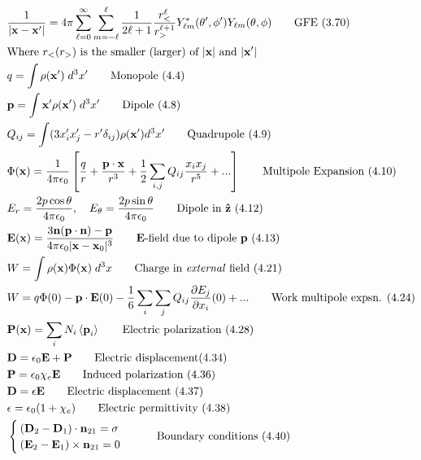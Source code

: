 \documentclass[10pt]{article}
\newcommand{\zhat}{\boldsymbol{\hat{\textbf{z}}}}
\newcommand{\vect}[1]{\boldsymbol{\mathbf{#1}}}
\newcommand{\vc}[1]{\mathbf{#1}}
\newcommand{\eo}{\epsilon_0}
\newcommand{\pder}[2]{\frac{\partial #1}{\partial #2}}
\newcommand{\ev}[1]{\left\langle #1 \right\rangle}
\newcommand{\K}{\frac{1}{4 \pi \eo}}
\begin{document}
\begin{multicols}{2}
\begin{align*}
		& \frac{1}{|\vc{x} - \vc{x}'|} = 4 \pi \sum_{\ell = 0}^\infty \sum_{m = -\ell}^{\ell} \frac{1}{2 \ell +1} \frac{r_<^\ell}{r_>^{\ell +1}} Y_{\ell m}^*(\theta', \phi') Y_{\ell m}(\theta,\phi)	\tag*{GFE (3.70)} \\
		&\text{Where $r_< (r_>)$ is the smaller (larger) of $|\vc{x}|$ and $|\vc{x}'|$} \\
		& q = \int \rho(\vect{x}') \; d^3x'	\tag*{Monopole (4.4)} \\
		& \vect{p} = \int \vect{x}' \rho(\vect{x}') \; d^3x'	\tag*{Dipole (4.8)} \\
		& Q_{ij} = \int (3 x_i' x_j'- r' \delta_{ij})\rho(\vect{x}') d^3x'		\tag*{Quadrupole (4.9)} \\
		&\Phi(\vect{x}) = \K \left[ \frac{q}{r} + \frac{ \vect{p} \cdot \vect{x}}{r^3} + \frac{1}{2} \sum_{i,j} Q_{ij} \frac{x_i x_j}{r^5} + ... \right] \tag*{Multipole Expansion (4.10)} \\
		& E_r=\frac{2 p \cos \theta}{4 \pi \eo}, \quad E_\theta=\frac{2 p \sin \theta}{4 \pi \eo} \tag*{Dipole in $\zhat$ (4.12)} \\
		& \vect{E}(\vect{x}) = \frac{3 \vect{n}(\vect{p} \cdot \vect{n}) - \vect{p}}{4 \pi \eo |\vect{x} - \vect{x}_0|^3} \tag*{$\vect{E}$-field due to dipole $\vect{p}$ (4.13)} \\
		& W = \int \rho(\vect{x}) \Phi(\vect{x})\; d^3x \tag*{Charge in \textit{external} field (4.21)} \\
		& W = q \Phi(0) - \vect{p} \cdot \vect{E}(0) - \frac{1}{6} \sum_i \sum_j Q_{ij} \pder{E_j}{x_i}(0) + ... \tag*{Work multipole expsn. (4.24)} \\
		& \vect{P}(\vect{x}) = \sum_i N_i \ev{\vect{p}_i} \tag*{Electric polarization (4.28)} \\
		& \vect{D} = \eo \vect{E} + \vect{P} \tag*{Electric displacement(4.34)} \\
		& \vect{P} = \eo \chi_e \vect{E} \tag*{Induced polarization (4.36)} \\
		& \vect{D} = \epsilon \vect{E} \tag*{Electric displacement (4.37)} \\
		& \epsilon = \eo (1 + \chi_e) \tag*{Electric permittivity (4.38)} \\
		& \begin{cases}
			(\vect{D}_2 - \vect{D}_1) \cdot \vect{n}_{21} = \sigma \\
			(\vect{E}_2 - \vect{E}_1) \times \vect{n}_{21} = 0 \\
		\end{cases}	\tag*{Boundary conditions (4.40)} \\

\end{align*}
\end{multicols}
\end{document}
